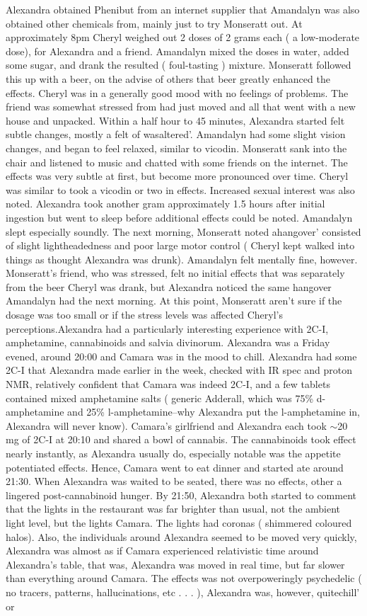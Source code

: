 \documentclass[12pt]{book}
\begin{document}
Alexandra obtained Phenibut from an internet supplier that Amandalyn was also obtained other chemicals from, mainly just to try Monseratt out. At approximately 8pm Cheryl weighed out 2 doses of 2 grams each ( a low-moderate dose), for Alexandra and a friend. Amandalyn mixed the doses in water, added some sugar, and drank the resulted ( foul-tasting ) mixture. Monseratt followed this up with a beer, on the advise of others that beer greatly enhanced the effects. Cheryl was in a generally good mood with no feelings of problems. The friend was somewhat stressed from had just moved and all that went with a new house and unpacked. Within a half hour to 45 minutes, Alexandra started felt subtle changes, mostly a felt of wasaltered'. Amandalyn had some slight vision changes, and began to feel relaxed, similar to vicodin. Monseratt sank into the chair and listened to music and chatted with some friends on the internet. The effects was very subtle at first, but become more pronounced over time. Cheryl was similar to took a vicodin or two in effects. Increased sexual interest was also noted. Alexandra took another gram approximately 1.5 hours after initial ingestion but went to sleep before additional effects could be noted. Amandalyn slept especially soundly. The next morning, Monseratt noted ahangover' consisted of slight lightheadedness and poor large motor control ( Cheryl kept walked into things as thought Alexandra was drunk). Amandalyn felt mentally fine, however. Monseratt's friend, who was stressed, felt no initial effects that was separately from the beer Cheryl was drank, but Alexandra noticed the same hangover Amandalyn had the next morning. At this point, Monseratt aren't sure if the dosage was too small or if the stress levels was affected Cheryl's perceptions.Alexandra had a particularly interesting experience with 2C-I, amphetamine, cannabinoids and salvia divinorum. Alexandra was a Friday evened, around 20:00 and Camara was in the mood to chill. Alexandra had some 2C-I that Alexandra made earlier in the week, checked with IR spec and proton NMR, relatively confident that Camara was indeed 2C-I, and a few tablets contained mixed amphetamine salts ( generic Adderall, which was 75\% d-amphetamine and 25\% l-amphetamine--why Alexandra put the l-amphetamine in, Alexandra will never know). Camara's girlfriend and Alexandra each took $\sim$20 mg of 2C-I at 20:10 and shared a bowl of cannabis. The cannabinoids took effect nearly instantly, as Alexandra usually do, especially notable was the appetite potentiated effects. Hence, Camara went to eat dinner and started ate around 21:30. When Alexandra was waited to be seated, there was no effects, other a lingered post-cannabinoid hunger. By 21:50, Alexandra both started to comment that the lights in the restaurant was far brighter than usual, not the ambient light level, but the lights Camara. The lights had coronas ( shimmered coloured halos). Also, the individuals around Alexandra seemed to be moved very quickly, Alexandra was almost as if Camara experienced relativistic time around Alexandra's table, that was, Alexandra was moved in real time, but far slower than everything around Camara. The effects was not overpoweringly psychedelic ( no tracers, patterns, hallucinations, etc . . .  ), Alexandra was, however, quitechill' or 
\end{document}
